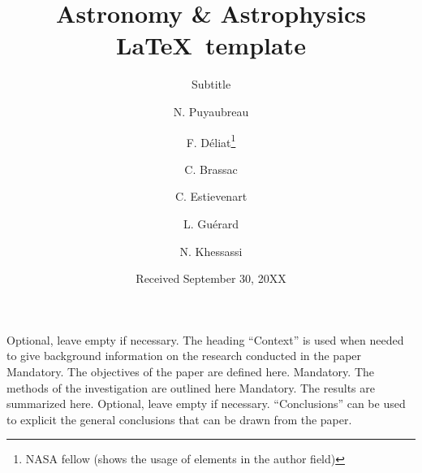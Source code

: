 \documentclass{aa}
\begin{document}
\title{Astronomy \& Astrophysics \LaTeX\ template}

\subtitle{Subtitle}

%
%
%

\author{N. Puyaubreau        %
	\and F. Déliat\fnmsep\thanks{NASA fellow (shows the usage of elements in the author field)}
	\and C. Brassac
	\and C. Estievenart
	\and L. Guérard
	\and N. Khessassi
}


\date{Received September 30, 20XX}


\abstract
{Optional, leave empty if necessary.  The heading “Context” is used when needed to
	give background information on the research conducted in the paper}
{Mandatory. The objectives of the paper are defined here.}
{Mandatory. The methods of the investigation are outlined here}
{Mandatory. The results are summarized here.}
{Optional, leave empty if necessary.  “Conclusions” can be used to
	explicit the general conclusions that can be drawn from the paper.}

\end{document}
